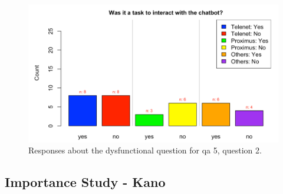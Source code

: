 \begin{figure}[!htb]
	\includegraphics[width=\linewidth, scale=0.5]{../LaTeX/Figures/Comparative/DQ5b.png}
	\caption{Responses about the dysfunctional question for \acrshort{qa} 5, question 2.}\label{fig:DQ5b}
\end{figure}
\FloatBarrier

\subsection{Importance Study - Kano}
